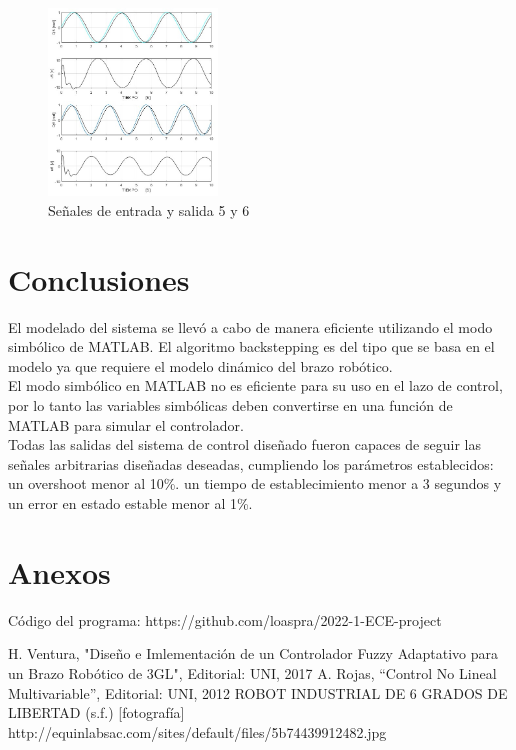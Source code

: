 \documentclass[conference]{IEEEtran}
\begin{document}
\begin{figure} [h]
\centering
\includegraphics[width=0.4\textwidth]{images/seguimiento/q5_q6_seg.jpg}
\caption{Señales de entrada y salida 5 y 6}
\end{figure}


\newpage
\section{Conclusiones}
El modelado del sistema se llevó a cabo de manera eficiente utilizando el modo simbólico de MATLAB. El algoritmo backstepping es del tipo que se basa en el modelo ya que requiere el modelo dinámico del brazo robótico.  \\
El modo simbólico en MATLAB no es eficiente para su uso en el lazo de control, por lo tanto las variables simbólicas deben convertirse en una función de MATLAB para simular el controlador.\\
Todas las salidas del sistema de control diseñado fueron capaces de seguir las señales arbitrarias diseñadas deseadas, cumpliendo los parámetros establecidos: un overshoot menor al 10\%. un tiempo de establecimiento menor a 3 segundos y un error en estado estable menor al 1\%.

\section{Anexos}
Código del programa: https://github.com/loaspra/2022-1-ECE-project

\begin{thebibliography}{00}
 H. Ventura, "Diseño e Imlementación de un Controlador Fuzzy Adaptativo para un Brazo Robótico de 3GL", Editorial: UNI, 2017
 A. Rojas, “Control No Lineal Multivariable”, Editorial: UNI, 2012
 ROBOT INDUSTRIAL DE 6 GRADOS DE LIBERTAD  (s.f.) [fotografía] http://equinlabsac.com/sites/default/files/5b74439912482.jpg
\end{thebibliography}
\vspace{12pt}
\end{document}
